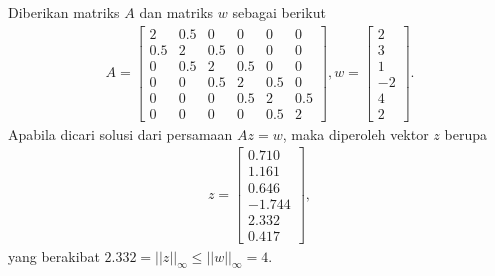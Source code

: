 \begin{contoh}
    Diberikan matriks $A$ dan matriks $w$ sebagai berikut
    \begin{gather*}
    A =
        \begin{bmatrix}
        2 & 0.5 & 0 & 0 & 0 & 0\\
        0.5 & 2 & 0.5 & 0 & 0 & 0\\
        0 & 0.5 & 2 & 0.5 & 0 & 0\\
        0 & 0 & 0.5 & 2 & 0.5 & 0 \\
        0 & 0 & 0 & 0.5 & 2 & 0.5\\
        0 & 0 & 0 & 0 & 0.5 & 2 
        \end{bmatrix}, w = \begin{bmatrix}
            2 \\
            3 \\
            1 \\
            -2 \\
            4 \\
            2
        \end{bmatrix}.
    \end{gather*}
    Apabila dicari solusi dari persamaan $Az=w$, maka diperoleh vektor $z$ berupa
    \begin{gather*}
        z=\begin{bmatrix}
            0.710\\
            1.161\\
            0.646\\
            -1.744\\
            2.332\\
            0.417
        \end{bmatrix},
    \end{gather*}
    yang berakibat $2.332 = ||z||_\infty \leq ||w||_\infty = 4$.
\end{contoh}

